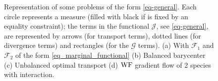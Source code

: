 \begin{figure}
\centering
 
\caption{Representation of some problems of the form \eqref{eq-general}. Each circle represents a measure (filled with black if is fixed by an equality constraint); the terms in the functional $\mathcal{J}$, see \eqref{eq-general}, are represented by arrows (for transport terms), dotted lines (for divergence terms) and rectangles (for the $\mathcal{G}$ terms). (a) With $\mathcal{F}_1$ and $\mathcal{F}_2$ of the form \eqref{eq_marginal_functional} (b) Balanced barycenter (c) Unbalanced optimal transport (d) $\operatorname{WF}$ gradient flow of 2 species with interaction.}
\label{fig_generic_problem}
\end{figure}




